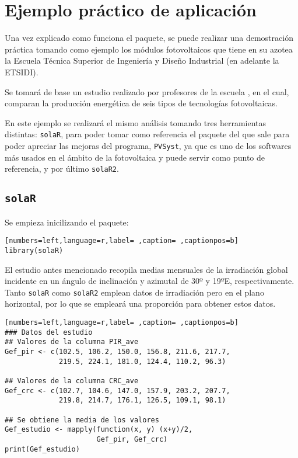 \chapter{Ejemplo práctico de aplicación}
\label{chap:ejemplo-practico-aplicacion}
Una vez explicado como funciona el paquete, se puede realizar una demostración práctica tomando como ejemplo los módulos fotovoltaicos que tiene en su azotea la Escuela Técnica Superior de Ingeniería y Diseño Industrial (en adelante la ETSIDI).

Se tomará de base un estudio realizado por profesores de la escuela \cite{adrada17}, en el cual, comparan la producción energética de seis tipos de tecnologías fotovoltaicas.

En este ejemplo se realizará el mismo análisis tomando tres herramientas distintas: \texttt{solaR}, para poder tomar como referencia el paquete del que sale para poder apreciar las mejoras del programa, \texttt{PVSyst}, ya que es uno de los softwares más usados en el ámbito de la fotovoltaica y puede servir como punto de referencia, y por último \texttt{solaR2}.

\section{\texttt{solaR}}
\label{sec:orgb32ec47}
Se empieza inicilizando el paquete:
\begin{lstlisting}[numbers=left,language=r,label= ,caption= ,captionpos=b]
library(solaR)
\end{lstlisting}

El estudio antes mencionado recopila medias mensuales de la irradiación global incidente en un ángulo de inclinación y azimutal de 30º y 19ºE, respectivamente. Tanto \texttt{solaR} como \texttt{solaR2} emplean datos de irradiación pero en el plano horizontal, por lo que se empleará una proporción para obtener estos datos.
\begin{lstlisting}[numbers=left,language=r,label= ,caption= ,captionpos=b]
### Datos del estudio
## Valores de la columna PIR_ave
Gef_pir <- c(102.5, 106.2, 150.0, 156.8, 211.6, 217.7,
             219.5, 224.1, 181.0, 124.4, 110.2, 96.3)

## Valores de la columna CRC_ave
Gef_crc <- c(102.7, 104.6, 147.0, 157.9, 203.2, 207.7,
             219.8, 214.7, 176.1, 126.5, 109.1, 98.1)

## Se obtiene la media de los valores
Gef_estudio <- mapply(function(x, y) (x+y)/2,
                      Gef_pir, Gef_crc)
print(Gef_estudio)
\end{lstlisting}

